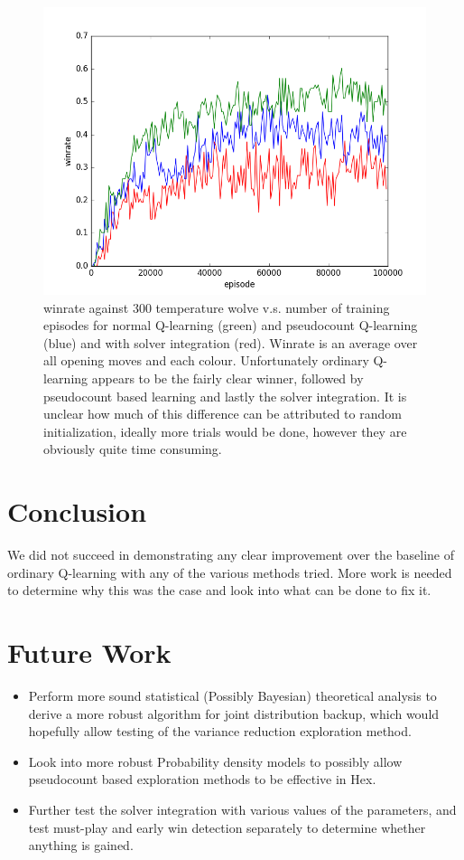 \documentclass{article}
\begin{document}
\begin{figure}[!ht]
\centering
\includegraphics[width=1\textwidth]{pics/wolve_learning_curves.png}
\caption{winrate against 300 temperature wolve v.s. number of training episodes for normal Q-learning (green) and pseudocount Q-learning (blue) and with solver integration (red). Winrate is an average over all opening moves and each colour. Unfortunately ordinary Q-learning appears to be the fairly clear winner, followed by pseudocount based learning and lastly the solver integration. It is unclear how much of this difference can be attributed to random initialization, ideally more trials would be done, however they are obviously quite time consuming.}
\label{fig:wolve_learning}
\end{figure}

\section*{Conclusion}
We did not succeed in demonstrating any clear improvement over the baseline of ordinary Q-learning with any of the various methods tried. More work is needed to determine why this was the case and look into what can be done to fix it.

\section*{Future Work}
\begin{itemize}
\item Perform more sound statistical (Possibly Bayesian) theoretical analysis to derive a more robust algorithm for joint distribution backup, which would hopefully allow testing of the variance reduction exploration method.
\item Look into more robust Probability density models to possibly allow pseudocount based exploration methods to be effective in Hex.
\item Further test the solver integration with various values of the parameters, and test must-play and early win detection separately to determine whether anything is gained.
\end{itemize}
\end{document}
